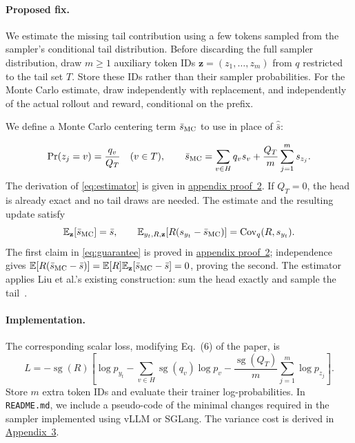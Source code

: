 \documentclass[10pt]{article}
\newcommand{\E}{\mathbb{E}}
\newcommand{\sg}{\operatorname{sg}}
\newcommand{\Cov}{\operatorname{Cov}}
\begin{document}
\paragraph{Proposed fix.}
We estimate the missing tail contribution using a few tokens sampled from the sampler's conditional tail distribution. Before discarding the full sampler distribution, draw $m\ge1$ auxiliary token IDs $\mathbf z=(z_1,\ldots,z_m)$ from $q$ restricted to the tail set $T$. Store these IDs rather than their sampler probabilities. For the Monte Carlo estimate, draw independently with replacement, and independently of the actual rollout and reward, conditional on the prefix.

We define a Monte Carlo centering term $\bar s_{\rm MC}$ to use in place of $\widehat{\bar s}$:

\begin{equation}\label{eq:estimator}
 \Pr(z_j=v)=\frac{q_v}{Q_T}\quad(v\in T),\qquad
 \bar s_{\rm MC}=\sum_{v\in H}q_v s_v+\frac{Q_T}{m}\sum_{j=1}^m s_{z_j}.
\end{equation}
The derivation of \eqref{eq:estimator} is given in \hyperref[app:unbiased]{appendix proof~2}. If $Q_T=0$, the head is already exact and no tail draws are needed. The estimate and the resulting update satisfy
\begin{equation}\label{eq:guarantee}
 \E_{\mathbf z}[\bar s_{\rm MC}]=\bar s,\qquad
 \E_{y_t,R,\mathbf z}[R(s_{y_t}-\bar s_{\rm MC})]=\Cov_q(R,s_{y_t}).
\end{equation}
The first claim in \eqref{eq:guarantee} is proved in \hyperref[app:unbiased]{appendix proof~2}; independence gives $\E[R(\bar s_{\rm MC}-\bar s)]=\E[R]\E_{\mathbf z}[\bar s_{\rm MC}-\bar s]=0$, proving the second. The estimator applies Liu et al.'s existing construction: sum the head exactly and sample the tail~\cite{liu2019}.


\paragraph{Implementation.}
The corresponding scalar loss, modifying Eq.~(6) of the paper, is
\begin{equation}\label{eq:loss}
 L=-\sg(R)\left[\log p_{y_t}-\sum_{v\in H}\sg(q_v)\log p_v
 -\frac{\sg(Q_T)}{m}\sum_{j=1}^m\log p_{z_j}\right].
\end{equation}
Store $m$ extra token IDs and evaluate their trainer log-probabilities. 
In \texttt{README.md}, we include a pseudo-code of the minimal changes required in the sampler implemented using vLLM or SGLang. The variance cost is derived in \hyperref[app:variance]{Appendix~3}.
\end{document}
